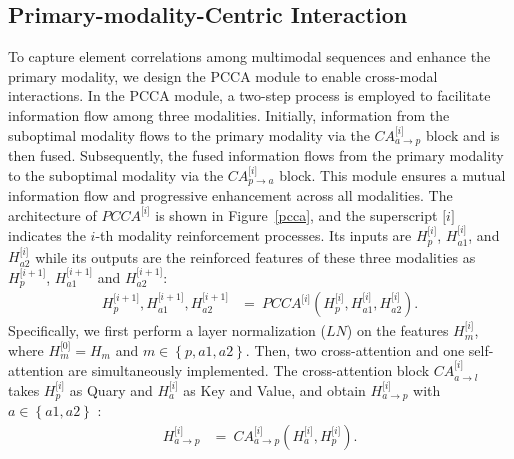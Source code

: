 \documentclass[letterpaper]{article} %
\begin{document}
\subsection{Primary-modality-Centric Interaction}
To capture element correlations among multimodal sequences and enhance the primary modality, we design the PCCA module to enable cross-modal interactions. In the PCCA module, a two-step process is employed to facilitate information flow among three modalities. Initially, information from the suboptimal modality flows to the primary modality via the ${CA}_{a\rightarrow p}^{\lbrack i\rbrack}$ block and is then fused. Subsequently, the fused information flows from the primary modality to the suboptimal modality via the ${CA}_{p\rightarrow a}^{\lbrack i\rbrack}$ block. This module ensures a mutual information flow and progressive enhancement across all modalities.  The architecture of $PCCA^{\lbrack i\rbrack}$ is shown in Figure~\ref{pcca}, and the superscript $\lbrack i\rbrack$ indicates the $i$-th modality reinforcement processes. Its inputs are $H_{p}^{\lbrack i\rbrack}$, $H_{a1}^{\lbrack i\rbrack}$,  and $H_{a2}^{\lbrack i\rbrack}$  while its outputs are the reinforced features of these three modalities as $H_{p}^{\lbrack i+1\rbrack}$, $H_{a1}^{\lbrack i+1\rbrack}$ and $H_{a2}^{\lbrack i+1\rbrack}$:
\begin{equation}
       \begin{aligned}
           H_{p}^{\lbrack i+1\rbrack},  H_{a1}^{\lbrack i+1\rbrack},  H_{a2}^{\lbrack i+1\rbrack} &= ~{PCCA}^{\lbrack                i\rbrack}\left( {H_{p}^{\lbrack i\rbrack},H_{a1}^{\lbrack i\rbrack},H_{a2}^{\lbrack i\rbrack}} \right).
       \end{aligned}
\end{equation}
Specifically, we first perform a layer normalization ($LN$) on the features  $
H_{m}^{\lbrack i\rbrack} $,  where $H_{m}^{\lbrack 0\rbrack} = H_{m}$ and $m \in \left\{ {p,a1,a2} \right\}$. Then, two cross-attention and one self-attention are simultaneously implemented. The cross-attention block ${CA}_{a\rightarrow l}^{\lbrack i\rbrack}$ takes $H_{p}^{\lbrack i\rbrack}$ as  Quary and  $H_{a}^{\lbrack i\rbrack}$ as Key and Value, and obtain $H_{a\rightarrow p}^{\lbrack i\rbrack}$ with $a \in \left\{ {a1,a2} \right\}$ :
\begin{equation}
       \begin{aligned}
           H_{a\rightarrow p}^{\lbrack i\rbrack} &= ~{CA}_{a\rightarrow p}^{\lbrack                i\rbrack}\left( {H_{a}^{\lbrack i\rbrack},H_{p}^{\lbrack  i\rbrack}} \right).
       \end{aligned}
\end{equation}
\end{document}
